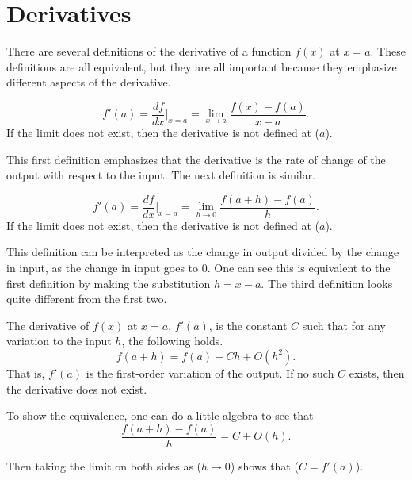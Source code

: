 \documentclass[twoside,openright,titlepage,a4paper]{book}
\begin{document}
\begin{sloppypar}
\section{Derivatives} \label{ChDifferentiationSecDerivatives}
There are several definitions of the derivative of a function $f(x)$ at $x=a$. These definitions are all equivalent, but they are all important because they emphasize different aspects of the derivative.
\begin{definitionbox}[title=\textbf{Derivative (first definition)}]
	\begin{equation*}
	f'(a) = \frac{df}{dx} \bigg|_{x=a} = \lim_{x \rightarrow a} \frac{f(x)-f(a)}{x-a}.
	\end{equation*}
	If the limit does not exist, then the derivative is not defined at ($a$).
\end{definitionbox}
This first definition emphasizes that the derivative is the rate of change of the output with respect to the input. The next definition is similar.
\begin{definitionbox}[title=\textbf{Derivative (second definition)}]
\begin{equation*}
f'(a) = \frac{df}{dx} \bigg|_{x=a} = \lim_{h \rightarrow 0} \frac{f(a+h)-f(a)}{h}.
\end{equation*}
If the limit does not exist, then the derivative is not defined at ($a$).
\end{definitionbox}
This definition can be interpreted as the change in output divided by the change in input, as the change in input goes to 0. One can see this is equivalent to the first definition by making the substitution $h = x-a$. The third definition looks quite different from the first two.
\begin{definitionbox}[title=\textbf{Derivative (third definition)}]
The derivative of $f(x)$ at $x=a$, $f'(a)$, is the constant $C$ such that for any variation to the input $h$, the following holds.
\begin{equation*}
f(a+h) = f(a) + Ch + O(h^2).
\end{equation*}
That is, $f'(a)$ is the first-order variation of the output. If no such $C$ exists, then the derivative does not exist.
\end{definitionbox}

To show the equivalence, one can do a little algebra to see that \[ \frac{f(a+h) - f(a)}{h} = C + O(h). \]

Then taking the limit on both sides as ($h \rightarrow 0$) shows that ($C = f'(a)$).


\end{sloppypar}
\end{document}
